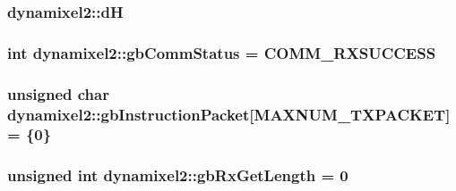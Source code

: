 \subsubsection[{d\+H}]{ dynamixel2\+::d\+H\hspace{0.3cm}{\ttfamily [private]}}\label{classdynamixel2_a69e9133771b69c828c277cb7191d3474}
\hypertarget{classdynamixel2_a703e327ba8ec5909c238dc94a00cb32d}{}
\subsubsection[{gb\+Comm\+Status}]{\setlength{\rightskip}{0pt plus 5cm}int dynamixel2\+::gb\+Comm\+Status = {\bf C\+O\+M\+M\+\_\+\+R\+X\+S\+U\+C\+C\+E\+S\+S}\hspace{0.3cm}{\ttfamily [private]}}\label{classdynamixel2_a703e327ba8ec5909c238dc94a00cb32d}
\hypertarget{classdynamixel2_a298efe9115fdbf77019af1001e801fb4}{}
\subsubsection[{gb\+Instruction\+Packet}]{\setlength{\rightskip}{0pt plus 5cm}unsigned char dynamixel2\+::gb\+Instruction\+Packet\mbox{[}{\bf M\+A\+X\+N\+U\+M\+\_\+\+T\+X\+P\+A\+C\+K\+E\+T}\mbox{]} = \{0\}\hspace{0.3cm}{\ttfamily [private]}}\label{classdynamixel2_a298efe9115fdbf77019af1001e801fb4}
\hypertarget{classdynamixel2_ad82d286e6b47c7243a3c5fd5ced0ebf4}{}
\subsubsection[{gb\+Rx\+Get\+Length}]{\setlength{\rightskip}{0pt plus 5cm}unsigned int dynamixel2\+::gb\+Rx\+Get\+Length = 0\hspace{0.3cm}{\ttfamily [private]}}\label{classdynamixel2_ad82d286e6b47c7243a3c5fd5ced0ebf4}
\hypertarget{classdynamixel2_a7ae9bffcc9f4b087c57640881ccbb378}{}
